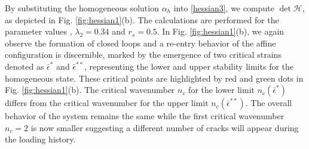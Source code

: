 By substituting the homogeneous solution $\alpha_h$ into \eqref{hessian3}, we compute $\det \mathcal{H}$, as depicted  in Fig. \ref{fig:hessian1}(b). The calculations are performed for the parameter values , $\lambda_2=0.34$ and $r_s=0.5$.  In Fig. \ref{fig:hessian1}(b), we again observe the formation of closed loops and a re-entry behavior of the affine configuration is discernible, marked by the emergence of two critical strains denoted as $\bar\epsilon^*$ and $\bar\epsilon^{**}$, representing the lower and upper stability limits for the homogeneous state. These critical points are highlighted by red and green dots in Fig. \ref{fig:hessian1}(b). The critical wavenumber $n_c$ for the lower limit $n_c(\bar{\epsilon}^*)$    differs from the critical wavenumber for the upper limit $n_c(\bar{\epsilon}^{**})$. The overall behavior of the system remains the same while the first critical wavenumber $n_c=2$ is now smaller suggesting a different number of cracks will appear during the loading history.
